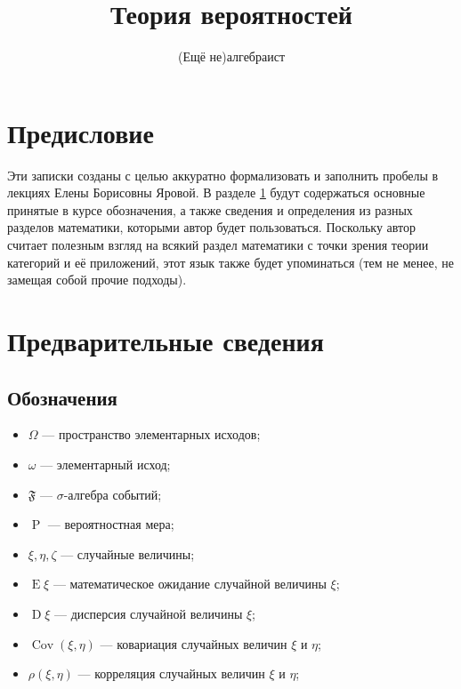\documentclass[12pt]{article}
\title{Теория вероятностей}
\author{(Ещё не)алгебраист}
\numberwithin{theorem}{section}
\theoremstyle{definition}
\newcommand{\prob}{\operatorname{P}}
\newcommand{\events}{\mathfrak{F}}
\newcommand{\expect}{\operatorname{E}}
\newcommand{\disp}{\operatorname{D}}
\newcommand{\cov}{\operatorname{Cov}}
\begin{document}
	\maketitle
	
	\section*{Предисловие}
	
	Эти записки созданы с целью аккуратно формализовать и заполнить пробелы в лекциях Елены Борисовны Яровой.
	В разделе \ref{preparing} будут содержаться основные принятые в курсе обозначения, 
	а также сведения и определения из разных разделов математики, которыми автор будет пользоваться.
	Поскольку автор считает полезным взгляд на всякий раздел математики с точки зрения теории категорий и её приложений, 
	этот язык также будет упоминаться (тем не менее, не замещая собой прочие подходы).
	
	\tableofcontents
	
	
	\section{Предварительные сведения} \label{preparing}
	
	\subsection{Обозначения}
	
	
	\begin{itemize}
		\item $ \Omega $ --- пространство элементарных исходов;
		\item $ \omega $ --- элементарный исход;
		\item $ \events $ --- $ \sigma $-алгебра событий;
		\item $ \prob $ --- вероятностная мера;
		\item $ \xi, \eta, \zeta $ --- случайные величины;
		\item $ \expect \xi $ --- математическое ожидание случайной величины $ \xi $;
		\item $ \disp \xi $ --- дисперсия случайной величины $ \xi $;
		\item $ \cov(\xi, \eta) $ --- ковариация случайных величин $ \xi $ и $ \eta $;
		\item $ \rho(\xi, \eta) $ --- корреляция случайных величин $ \xi $ и $ \eta $;
	\end{itemize}
	
\end{document}

